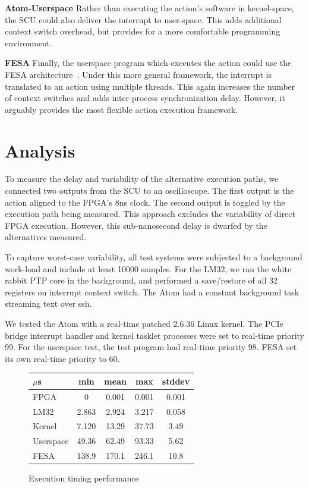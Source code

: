 \documentclass{JAC2003}
\begin{document}
\textbf{Atom-Userspace}
Rather than executing the action's software in kernel-space,
the SCU could also deliver the interrupt to user-space.
This adds additional context switch overhead, 
but provides for a more comfortable programming environment.

\textbf{FESA}
Finally, the userspace program which executes the action could use the FESA
architecture~\cite{fesa-ref}.
Under this more general framework,
the interrupt is translated to an action using multiple threads.
This again increases the number of context switches and adds inter-process
synchronization delay.
However, it arguably provides the most flexible action execution framework.

\section{Analysis}
To measure the delay and variability of the alternative execution paths,
we connected two outputs from the SCU to an oscilloscope.
The first output is the action aligned to the FPGA's 8ns clock.
The second output is toggled by the execution path being measured.
This approach excludes the variability of direct FPGA execution.
However, this sub-nanosecond delay is dwarfed by the alternatives measured.

To capture worst-case variability, 
all test systems were subjected to a background work-load
and include at least 10000 samples.
For the LM32, 
we ran the white rabbit PTP core in the background,
and performed a save/restore of all 32 registers on interrupt context switch.
The Atom had a constant background task streaming text over ssh.

We tested the Atom with a real-time patched 2.6.36 Linux kernel.
The PCIe bridge interrupt handler and kernel tasklet processes were set to
real-time priority 99.
For the userspace test, the test program had real-time priority 98.
FESA set its own real-time priority to 60.

\begin{figure}[t]
   \centering
   \begin{tabular}{l|c|c|c|c}
     $\mu$s    & min   & mean  & max   & stddev \\
     \hline
     FPGA      & 0 & 0.001 & 0.001 & 0.001 \\
     LM32      & 2.863 & 2.924 & 3.217 & 0.058  \\
     Kernel    & 7.120 & 13.29 & 37.73 & 3.49   \\
     Userspace & 49.36 & 62.49 & 93.33 & 5.62   \\
     FESA      & 138.9 & 170.1 & 246.1 & 10.8 \\
   \end{tabular}
   \caption{Execution timing performance}
\end{figure}
\end{document}
